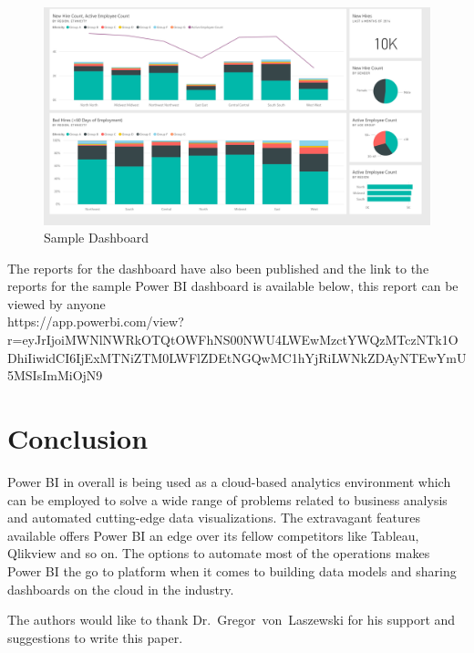 \begin{figure}[!ht]
  \centering\includegraphics[width=\columnwidth]{image/dashboard.png}
  \caption{Sample Dashboard}\label{f:Dashboard}
\end{figure}

The reports for the dashboard have also been published and the link to the 
reports for the sample Power BI dashboard is available below, this report 
can be viewed by anyone \\
https://app.powerbi.com/view?r=eyJrIjoiMWNlNWRkOTQtOWFhNS00NWU4LWEwMzctYWQzMTczNTk1ODhiIiwidCI6IjExMTNiZTM0LWFlZDEtNGQwMC1hYjRiLWNkZDAyNTEwYmU5MSIsImMiOjN9
 
\section{Conclusion}
Power BI in overall is being used as a cloud-based analytics environment which 
can be employed to solve a wide range of problems related to business analysis 
and automated cutting-edge data visualizations. The extravagant features 
available offers Power BI an edge over its fellow competitors like Tableau, 
Qlikview and so on. The options to automate most of the operations makes 
Power BI the go to platform when it comes to building data models and sharing 
dashboards on the cloud in the industry.
 
\begin{acks}

The authors would like to thank Dr.~Gregor~von~Laszewski for his
support and suggestions to write this paper.

\end{acks}


 